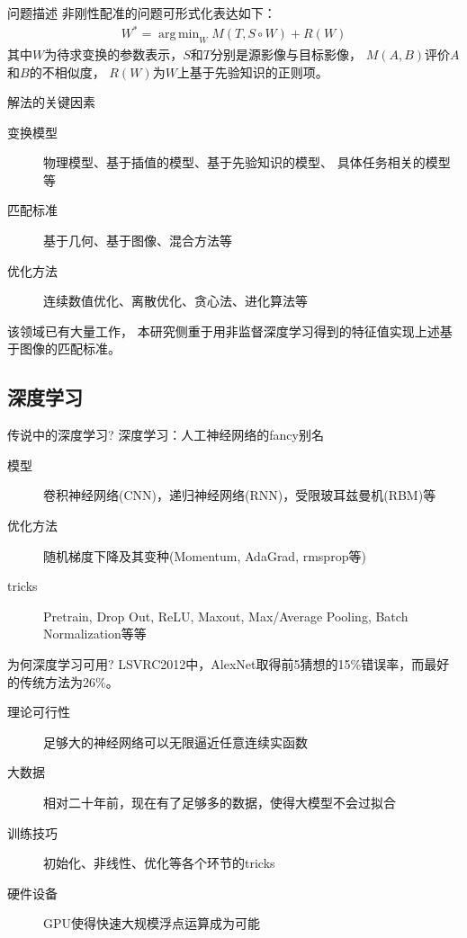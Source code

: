 \documentclass {beamer}
\DeclareMathOperator*{\argmin}{arg\,min}
\begin{document}
\begin{frame}{问题描述}
    非刚性配准的问题可形式化表达如下\cite{sotiras2013deformable}：
    \begin{eqnarray*}
        W^* = \argmin_{W} M(T, S \circ W) + R(W)
    \end{eqnarray*}
    其中$W$为待求变换的参数表示，$S$和$T$分别是源影像与目标影像，
    $M(A, B)$评价$A$和$B$的不相似度，
    $R(W)$为$W$上基于先验知识的正则项。
\end{frame}

\begin{frame}{解法的关键因素}
    \begin{description}
        \item[变换模型] 物理模型、基于插值的模型、基于先验知识的模型、
            具体任务相关的模型等
        \item[匹配标准] 基于几何、基于图像、混合方法等
        \item[优化方法] 连续数值优化、离散优化、贪心法、进化算法等
    \end{description}
    该领域已有大量工作，
    本研究侧重于用非监督深度学习得到的特征值实现上述基于图像的匹配标准。
\end{frame}

\subsection{深度学习}

\begin{frame}{传说中的深度学习?}
    深度学习：人工神经网络的fancy别名
    \begin{description}
        \item[模型] 卷积神经网络(CNN)，递归神经网络(RNN)，受限玻耳兹曼机(RBM)等
        \item[优化方法] 随机梯度下降及其变种(Momentum, AdaGrad, rmsprop等)
        \item[tricks] Pretrain, Drop Out, ReLU, Maxout,
            Max/Average Pooling, Batch Normalization等等
    \end{description}
\end{frame}

\begin{frame}{为何深度学习可用?}
    LSVRC2012中，AlexNet取得前5猜想的15\%错误率，而最好的传统方法为26\%。
    \begin{description}
        \item[理论可行性] 足够大的神经网络可以无限逼近任意连续实函数
        \item[大数据] 相对二十年前，现在有了足够多的数据，使得大模型不会过拟合
        \item[训练技巧] 初始化、非线性、优化等各个环节的tricks
        \item[硬件设备] GPU使得快速大规模浮点运算成为可能
    \end{description}
\end{frame}
\end{document}
